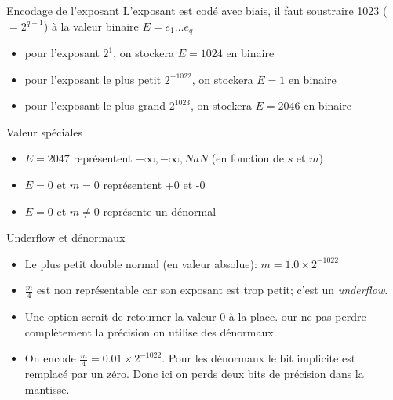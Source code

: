 \documentclass{beamer}
\begin{document}
\begin{frame}{Encodage de l'exposant}
    L'exposant est codé avec biais, il faut soustraire 1023 ($ = 2^{q-1}$) à la valeur binaire $E=e_1\ldots e_q$
    \begin{itemize}
        \item pour l'exposant $2^1$, on stockera $E = 1024$ en binaire
        \item pour l'exposant le plus petit $2^{-1022}$, on stockera $E = 1$ en binaire
        \item pour l'exposant le plus grand $2^{1023}$, on stockera $E = 2046$ en binaire
    \end{itemize}

    \begin{block}{Valeur spéciales}
        \begin{itemize}
            \item $E = 2047$ représentent $+\infty, -\infty, NaN$ (en fonction de $s$ et $m$)
            \item $E = 0$ et $m = 0$ représentent +0 et -0
            \item $E = 0$ et $m \neq 0$ représente un dénormal
        \end{itemize}
    \end{block}
\end{frame}

\begin{frame}{Underflow et dénormaux}

    \begin{itemize}
        \item Le plus petit double normal (en valeur absolue): $ m = 1.0 \times 2^{-1022} $
        \item $\frac{m}{4}$ est non représentable car son exposant est trop petit; c'est un \emph{underflow}.
        \item Une option serait de retourner la valeur $0$ à la place. our ne pas
              perdre complètement la précision on utilise des dénormaux.
        \item On encode $ \frac{m}{4} = 0.01 \times 2^{-1022} $. Pour les dénormaux le bit implicite est remplacé par un zéro. Donc ici on perds deux bits de précision dans la mantisse.
    \end{itemize}
\end{frame}
\end{document}
